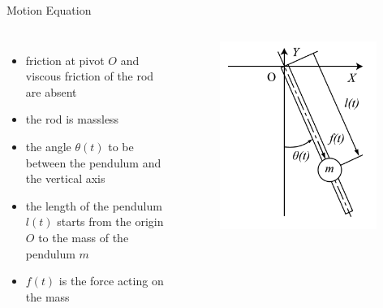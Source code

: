\documentclass[10pt]{beamer}
\begin{document}
  \begin{frame}{Motion Equation}
    \begin{columns}[c,onlytextwidth]
        \begin{itemize}
          \item friction at pivot $O$ and viscous friction of
            the rod are absent\\
          \item the rod is massless\\
          \item the angle $\theta(t)$ to be between the pendulum and the
            vertical axis\\
          \item the length of the pendulum $l(t)$ starts from the
            origin $O$ to the mass of the pendulum $m$\\
          \item $f(t)$ is the force acting on the mass
        \end{itemize}
        \begin{figure}
          \includegraphics[width=0.96\textwidth,right]{images/vlp.png}
        \end{figure}
    \end{columns}
  \end{frame}
\end{document}

